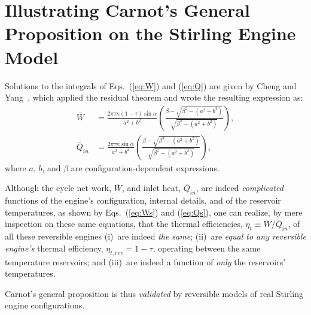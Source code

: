 \section{Illustrating Carnot's General Proposition on the Stirling Engine Model}

    Solutions to the integrals of Eqs.~(\ref{eq:W}) and (\ref{eq:Q})  are  given  by  Cheng  and
    Yang~\cite{2012-ChengCH+YangHS-ApEnergy}, which applied the residual theorem and  wrote  the
    resulting expression as:
    \begin{align}
        \label{eq:Ws}
        \bar{W}         &=  \frac{2\pi\tau\kappa(1 - \tau)\sin\alpha}{a^2 + b^2}\left(
                                \frac{\beta - \sqrt{\beta^2 - (a^2 + b^2)}}{\sqrt{\beta^2 - (a^2 + b^2)}}
                            \right),\\
        \label{eq:Qs}
        \bar{Q}_{in}    &=  \frac{2\pi\tau\kappa\sin\alpha}{a^2 + b^2}\left(
                                \frac{\beta - \sqrt{\beta^2 - (a^2 + b^2)}}{\sqrt{\beta^2 - (a^2 + b^2)}}
                            \right),
    \end{align}
    \noindent where $a$, $b$, and $\beta$ are configuration-dependent expressions.

    Although the  cycle  net  work,  $\bar{W}$,  and  inlet  heat,  $\bar{Q}_{in}$,  are  indeed
    \emph{complicated} functions of the engine's configuration, internal  details,  and  of  the
    reservoir temperatures, as shown by Eqs.~(\ref{eq:Ws}) and (\ref{eq:Qs}), one  can  realize,
    by mere inspection on these same equations, that the thermal  efficiencies,  $\eta_t  \equiv
    \bar{W} / \bar{Q}_{in}$, of all these reversible engines  (i)~are  indeed  \emph{the  same};
    (ii)~are \emph{equal to any reversible engine's} thermal efficiency,  $\eta_{t,rev}  =  1  -
    \tau$, operating between the same temperature reservoirs; and (iii)~are indeed a function of
    \emph{only} the reservoirs' temperatures.

    Carnot's general proposition is thus \emph{validated} by reversible models of real  Stirling
    engine configurations.

